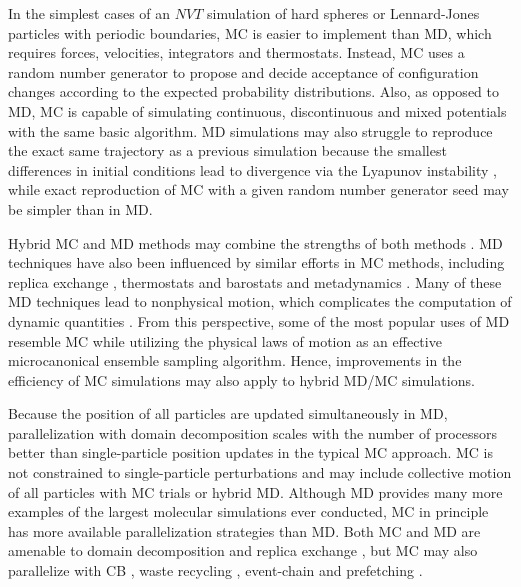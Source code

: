 \documentclass[
  9pt,
  bestpractices,
  pubversion,
]{livecoms}
\begin{document}
In the simplest cases of an $NVT$ simulation of hard spheres or Lennard-Jones particles with periodic boundaries, MC is easier to implement than MD, which requires forces, velocities, integrators and thermostats.
Instead, MC uses a random number generator to propose and decide acceptance of configuration changes according to the expected probability distributions.
Also, as opposed to MD, MC is capable of simulating continuous, discontinuous and mixed potentials with the same basic algorithm.
MD simulations may also struggle to reproduce the exact same trajectory as a previous simulation because the smallest differences in initial conditions lead to divergence via the Lyapunov instability \cite{posch_lyapunov_1988}, while exact reproduction of MC with a given random number generator seed may be simpler than in MD.

Hybrid MC and MD methods may combine the strengths of both methods \cite{duane_hybrid_1987, hartmann_ergodic_2008, ghoufi_hybrid_2010, spiridon_hamiltonian_2017, guo_hybrid_2018, fass_quantifying_2018, barhaghi_py-mcmd_2022}.
MD techniques have also been influenced by similar efforts in MC methods, including replica exchange \cite{swendsen_replica_1986, berg_multicanonical_1991, hukushima_exchange_1996, sugita_replica-exchange_1999}, thermostats and barostats \cite{andersen_molecular_1980} and metadynamics \cite{laio_escaping_2002}.
Many of these MD techniques lead to nonphysical motion, which complicates the computation of dynamic quantities \cite{basconi_effects_2013}.
From this perspective, some of the most popular uses of MD resemble MC while utilizing the physical laws of motion as an effective microcanonical ensemble sampling algorithm.
Hence, improvements in the efficiency of MC simulations may also apply to hybrid MD/MC simulations.

Because the position of all particles are updated simultaneously in MD, parallelization with domain decomposition \cite{plimpton_fast_1995} scales with the number of processors better than single-particle position updates in the typical MC approach.
MC is not constrained to single-particle perturbations and may include collective motion of all particles with MC trials \cite{rao_force_1979, liu_rejection-free_2004, liu_generalized_2005, whitelam_avoiding_2007} or hybrid MD.
Although MD provides many more examples of the largest molecular simulations ever conducted, MC in principle has more available parallelization strategies than MD.
Both MC and MD are amenable to domain decomposition \cite{ren_acceleration_2006, anderson_scalable_2016} and replica exchange \cite{swendsen_replica_1986}, but MC may also parallelize with CB \cite{esselink_parallel_1995, vlugt_efficiency_1999}, waste recycling \cite{frenkel_speed-up_2004}, event-chain \cite{michel_generalized_2014} and prefetching \cite{brockwell_parallel_2006, calderhead_general_2014, hatch_parallel_2020}.
\end{document}

